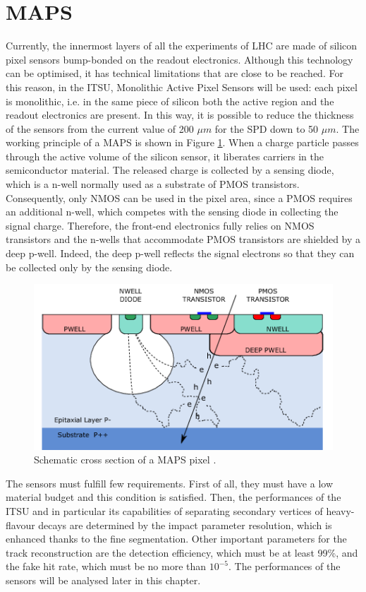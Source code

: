 \section{MAPS}
\label{sec:maps}
Currently, the innermost layers of all the experiments of LHC are made of silicon pixel sensors bump-bonded on the readout electronics. Although this technology can be optimised, it has technical limitations that are close to be reached. For this reason, in the ITSU, Monolithic Active Pixel Sensors will be used: each pixel is monolithic, i.e. in the same piece of silicon both the active region and the readout electronics are present. In this way, it is possible to reduce the thickness of the sensors from the current value of 200 $\mu m$ for the SPD down to 50 $\mu m$. The working principle of a MAPS is shown in Figure \ref{fig:maps}. When a charge particle passes through the active volume of the silicon sensor, it liberates carriers in the semiconductor material. The released charge is collected by a sensing diode, which is a n-well normally used as a substrate of PMOS transistors. Consequently, only NMOS can be used in the pixel area, since a PMOS requires an additional n-well, which competes with the sensing diode in collecting the signal charge. Therefore, the front-end electronics fully relies on NMOS transistors and the n-wells that accommodate PMOS transistors are shielded by a deep p-well. Indeed, the deep p-well reflects the signal electrons so that they can be collected only by the sensing diode.
%
\begin{figure}
  \centering
  \includegraphics[scale=0.7]{figures/maps.png}
  \caption{Schematic cross section of a MAPS pixel \cite{uptdr}.}
  \label{fig:maps}
\end{figure}
%
The sensors must fulfill few requirements. First of all, they must have a low material budget and this condition is satisfied. Then, the performances of the ITSU and in particular its capabilities of separating secondary vertices of heavy-flavour decays are determined by the impact parameter resolution, which is enhanced thanks to the fine segmentation. Other important parameters for the track reconstruction are the detection efficiency, which must be at least 99\%, and the fake hit rate, which must be no more than $10^{-5}$. The performances of the sensors will be analysed later in this chapter.\\
